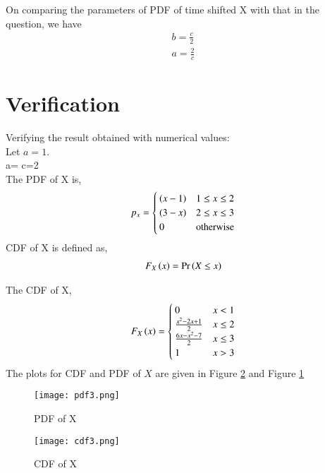 \documentclass[journal,12pt,twocolumn]{IEEEtran}
\begin{document}
On comparing the parameters of PDF of time shifted X with that in the question, we have
\begin{align}
    b=\frac{c}{2}\\
    a=\frac{2}{c}
\end{align}
\section*{Verification}
Verifying the result obtained with numerical values:\\
Let $a=1$.\\
\because a= \implies c=2\\

The PDF of X is,
\begin{align}
p_x = 
\begin{cases}
\left(x-1\right) & 1 \le x \le 2\\
\left(3-x\right) & 2 \le x \le 3 \\
0 & \text{otherwise}
\end{cases}
\end{align}
CDF of X is defined as,
\begin{align}
    F_X\left(x\right)=\Pr\left(X \le x\right)
\end{align}

The CDF of X,
\begin{align}
F_X\left(x\right) = 
\begin{cases}
0 & x < 1\\
\frac{x^2-2x+1}{2} &  x \le 2\\
\frac{6x-x^2-7}{2} & x \le 3 \\
1 & x > 3
\end{cases}
\end{align}
The plots for CDF and PDF of $X$ are given in Figure \ref{fig:cdf3} and Figure \ref{fig:pdf3}
\begin{figure}[h!]
\centering
\texttt{[image: pdf3.png]}
\caption{PDF of X}
\label{fig:pdf3}
\end{figure}
\begin{figure}[h!]
\centering
\texttt{[image: cdf3.png]}
\caption{CDF of X}
\label{fig:cdf3}
\end{figure}
\end{document}

